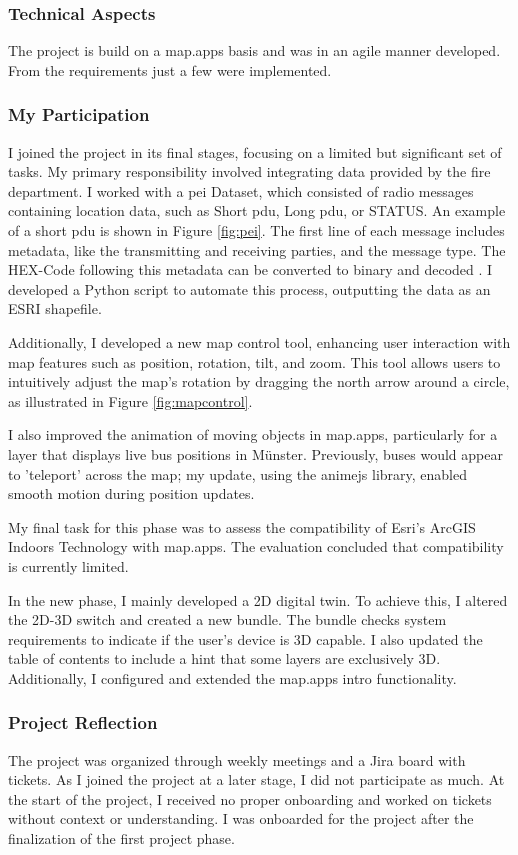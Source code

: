 \documentclass[11pt, titlepage, a4paper]{article}
\begin{document}
\subsubsection{Technical Aspects}
The project is build on a map.apps basis and was in an agile manner developed. From the requirements just a few were implemented.

\subsubsection{My Participation}
I joined the project in its final stages, focusing on a limited but significant set of tasks. My primary responsibility involved integrating data provided by the fire department. I worked with a \gls{pei} Dataset, which consisted of radio messages containing location data, such as Short \gls{pdu}, Long \gls{pdu}, or STATUS. An example of a short \gls{pdu} is shown in Figure \ref{fig:pei}. The first line of each message includes metadata, like the transmitting and receiving parties, and the message type. The HEX-Code following this metadata can be converted to binary and decoded \cite{etsiETSITS1002007}. I developed a Python script to automate this process, outputting the data as an ESRI shapefile.

Additionally, I developed a new map control tool, enhancing user interaction with map features such as position, rotation, tilt, and zoom. This tool allows users to intuitively adjust the map's rotation by dragging the north arrow around a circle, as illustrated in Figure \ref{fig:mapcontrol}.


I also improved the animation of moving objects in map.apps, particularly for a layer that displays live bus positions in Münster. Previously, buses would appear to 'teleport' across the map; my update, using the animejs library, enabled smooth motion during position updates.

My final task for this phase was to assess the compatibility of Esri's ArcGIS Indoors Technology with map.apps. The evaluation concluded that compatibility is currently limited.

In the new phase, I mainly developed a 2D digital twin. To achieve this, I altered the 2D-3D switch and created a new bundle. The bundle checks system requirements to indicate if the user's device is 3D capable. I also updated the table of contents to include a hint that some layers are exclusively 3D.
Additionally, I configured and extended the map.apps intro functionality.
\subsubsection{Project Reflection}
The project was organized through weekly meetings and a Jira board with tickets. As I joined the project at a later stage, I did not participate as much. At the start of the project, I received no proper onboarding and worked on tickets without context or understanding. I was onboarded for the project after the finalization of the first project phase. %
\end{document}

